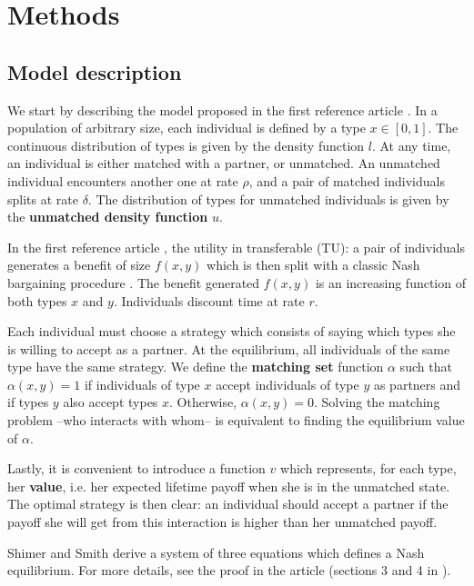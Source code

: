\section*{Methods}

\subsection*{Model description}

We start by describing the model proposed in the first reference article \citep{shimer_assortative_2000}. In a population of arbitrary size, each individual is defined by a type $x \in [0,1]$. The continuous distribution of types is given by the density function $l$. At any time, an individual is either matched with a partner, or unmatched. An unmatched individual encounters another one at rate $\rho$, and a pair of matched individuals splits at rate $\delta$. The distribution of types for unmatched individuals is given by the \textbf{unmatched density function} $u$.

In the first reference article \citep{shimer_assortative_2000}, the utility in transferable (TU): a pair of individuals generates a benefit of size $f(x,y)$ which is then split with a classic Nash bargaining procedure \citep{osborne_bargaining_1990,shimer_assortative_2000}. The benefit generated $f(x,y)$ is an increasing function of both types $x$ and $y$. Individuals discount time at rate $r$.

Each individual must choose a strategy which consists of saying which types she is willing to accept as a partner. At the equilibrium, all individuals of the same type have the same strategy. We define the \textbf{matching set} function $\alpha$ such that $\alpha(x,y) = 1$ if individuals of type $x$ accept individuals of type $y$ as partners and if types $y$ also accept types $x$. Otherwise, $\alpha(x,y) = 0$. Solving the matching problem --who interacts with whom-- is equivalent to finding the equilibrium value of $\alpha$.

Lastly, it is convenient to introduce a function $v$ which represents, for each type, her \textbf{value}, i.e. her expected lifetime payoff when she is in the unmatched state. The optimal strategy is then clear: an individual should accept a partner if the payoff she will get from this interaction is higher than her unmatched payoff.

Shimer and Smith derive a system of three equations which defines a Nash equilibrium. For more details, see the proof in the article (sections 3 and 4 in \citep{shimer_assortative_2000}).

